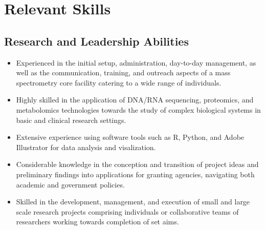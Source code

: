 \documentclass[11pt]{article}
\begin{document}
\section*{Relevant Skills}
\begin{addmargin}[3em]{2em}%
	\subsection*{Research and Leadership Abilities}
	\begin{itemize}
		\item Experienced in the initial setup, administration, day-to-day management, as well as the communication, training, and outreach aspects of a mass spectrometry core facility catering to a wide range of individuals.
		\item Highly skilled in the application of DNA/RNA sequencing, proteomics, and metabolomics technologies towards the study of complex biological systems in basic and clinical research settings.
		\item Extensive experience using software tools such as R, Python, and Adobe Illustrator for data analysis and visalization.
		\item Considerable knowledge in the conception and transition of project ideas and preliminary findings into applications for granting agencies, navigating both academic and government policies.
		\item Skilled in the development, management, and execution of small and large scale research projects comprising individuals or collaborative teams of researchers working towards completion of set aims.



\end{itemize}
\end{addmargin}
\end{document}
